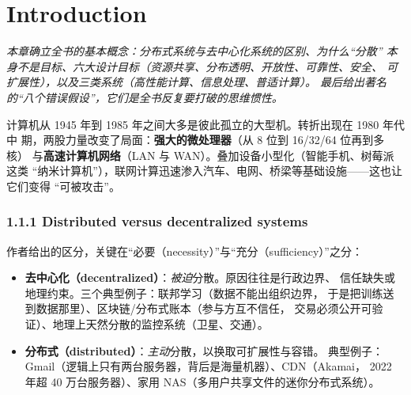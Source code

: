 \chapter{Introduction}
\begin{center}
\begin{minipage}{0.9\textwidth}
\itshape\small\color{dsgray}
本章确立全书的基本概念：分布式系统与去中心化系统的区别、为什么“分散”
本身不是目标、六大设计目标（资源共享、分布透明、开放性、可靠性、安全、
可扩展性），以及三类系统（高性能计算、信息处理、普适计算）。
最后给出著名的“八个错误假设”，它们是全书反复要打破的思维惯性。
\end{minipage}
\end{center}


计算机从 1945 年到 1985 年之间大多是彼此孤立的大型机。转折出现在 1980 年代中
期，两股力量改变了局面：\textbf{强大的微处理器}（从 8 位到 16/32/64 位再到多核）
与\textbf{高速计算机网络}（LAN 与 WAN）。叠加设备小型化（智能手机、树莓派这类
“纳米计算机”），联网计算迅速渗入汽车、电网、桥梁等基础设施——这也让它们变得
“可被攻击”。

\subsection*{1.1.1 Distributed versus decentralized systems}

作者给出的区分，关键在“必要（necessity）”与“充分（sufficiency）”之分：

\begin{itemize}
  \item \textbf{去中心化（decentralized）}：\emph{被迫}分散。原因往往是行政边界、
        信任缺失或地理约束。三个典型例子：联邦学习（数据不能出组织边界，
        于是把训练送到数据那里）、区块链/分布式账本（参与方互不信任，
        交易必须公开可验证）、地理上天然分散的监控系统（卫星、交通）。
  \item \textbf{分布式（distributed）}：\emph{主动}分散，以换取可扩展性与容错。
        典型例子：Gmail（逻辑上只有两台服务器，背后是海量机器）、CDN（Akamai，
        2022 年超 40 万台服务器）、家用 NAS（多用户共享文件的迷你分布式系统）。
\end{itemize}

\begin{closeread}
\end{closeread}

